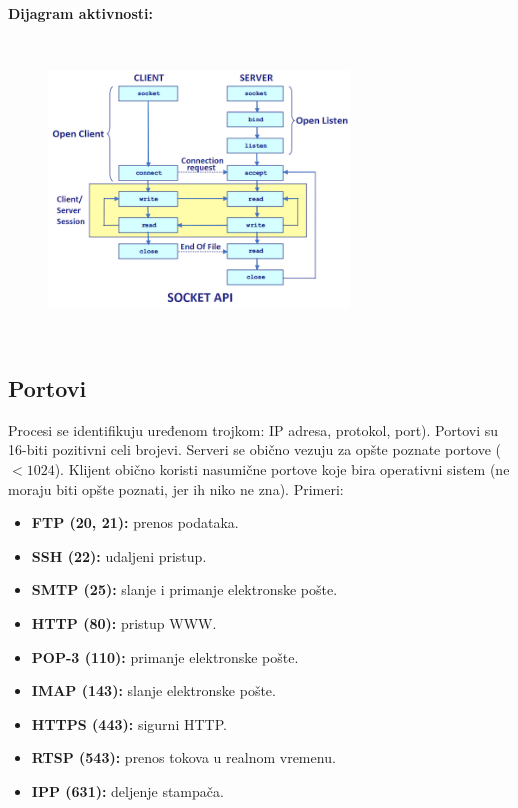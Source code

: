 \documentclass[a4paper]{article}
\begin{document}
    \noindent \textbf{Dijagram aktivnosti:}
    \begin{figure}[H]
        \begin{center}
            \includegraphics[width=80mm,height=80mm]{Slike/socket_api.png}
        \end{center}
    \end{figure}

    \subsection{Portovi}
        Procesi se identifikuju uređenom trojkom: IP adresa, protokol, port). Portovi su 16-biti
        pozitivni celi brojevi. Serveri se obično vezuju za opšte poznate portove ($<1024$).
        Klijent obično koristi nasumične portove koje bira operativni sistem (ne moraju biti
        opšte poznati, jer ih niko ne zna). Primeri:
        \begin{itemize}
            \item \textbf{FTP (20, 21):} prenos podataka.
            \item \textbf{SSH (22):} udaljeni pristup.
            \item \textbf{SMTP (25):} slanje i primanje elektronske pošte.
            \item \textbf{HTTP (80):} pristup WWW.
            \item \textbf{POP-3 (110):} primanje elektronske pošte.
            \item \textbf{IMAP (143):} slanje elektronske pošte.
            \item \textbf{HTTPS (443):} sigurni HTTP.
            \item \textbf{RTSP (543):} prenos tokova u realnom vremenu.
            \item \textbf{IPP (631):} deljenje stampača.
        \end{itemize}
\end{document}

